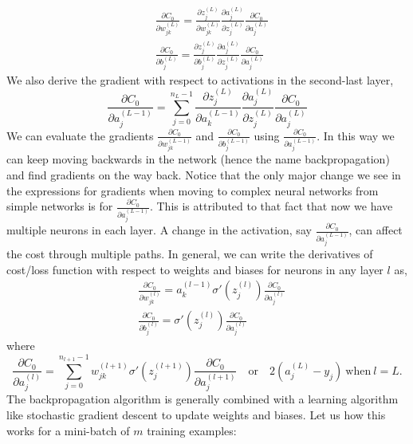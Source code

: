 \begin{equation}
    \label{eq:bp_eq_d}
    \begin{aligned}
        &\frac{\partial C_0}{\partial w_{jk}^{(L)}} = \frac{\partial z_j^{(L)}}{\partial w_{jk}^{(L)}} \frac{\partial a_j^{(L)}}{\partial z_j^{(L)}}\frac{\partial C_0}{\partial a_j^{(L)}}\\
        &\frac{\partial C_0}{\partial b_j^{(L)}} = \frac{\partial z_j^{(L)}}{\partial b_j^{(L)}} \frac{\partial a_j^{(L)}}{\partial z_j^{(L)}}\frac{\partial C_0}{\partial a_j^{(L)}}
    \end{aligned}
\end{equation}
We also derive the gradient with respect to activations in the second-last layer,
$$\frac{\partial C_0}{\partial a_j^{(L-1)}} = \sum_{j=0}^{n_{L} -1} \frac{\partial z_j^{(L)}}{\partial a_k^{(L-1)}} \frac{\partial a_j^{(L)}}{\partial z_j^{(L)}}\frac{\partial C_0}{\partial a_j^{(L)}}$$
We can evaluate the gradients $\frac{\partial C_0}{\partial w_{jk}^{(L-1)}}$ and $\frac{\partial C_0}{\partial b_j^{(L-1)}}$ using $\frac{\partial C_0}{\partial a_j^{(L-1)}}$. In this way we can keep moving backwards in the network (hence the name backpropagation)
and find gradients on the way back.  Notice that the only major change we see in the expressions for gradients when moving to complex neural networks from simple networks is for $\frac{\partial C_0}{\partial a_j^{(L-1)}}$. 
This is attributed to that fact that now we have multiple neurons in each layer. A change in the activation, say $\frac{\partial C_0}{\partial a_j^{(L-1)}}$, can affect the cost through multiple paths.
In general, we can write the derivatives of cost/loss function with respect to weights and biases for neurons in any layer $l$ as,
\begin{equation}
    \label{eq:bp_eq}
    \begin{aligned}
        &\frac{\partial C_0}{\partial w_{jk}^{(l)}} = a_k^{(l-1)}\sigma'(z_j^{(l)}) \frac{\partial C_0}{\partial a_j^{(l)}}\\
        &\frac{\partial C_0}{\partial b_j^{(l)}} = \sigma'(z_j^{(l)}) \frac{\partial C_0}{\partial a_j^{(l)}}
    \end{aligned}
\end{equation}
where 
$$\frac{\partial C_0}{\partial a_j^{(l)}} = \sum_{j=0}^{n_{l+1} -1} w_{jk}^{(l+1)} \sigma'(z_j^{(l+1)}) \frac{\partial C_0}{\partial a_j^{(l+1)}} \quad \text{or} \quad  2(a_j^{(L)} - y_j) \ \text{when} \ l=L.$$
The backpropagation algorithm is generally combined with a learning algorithm like stochastic gradient descent to update weights and biases. Let us how this works for a mini-batch of $m$ training examples:
